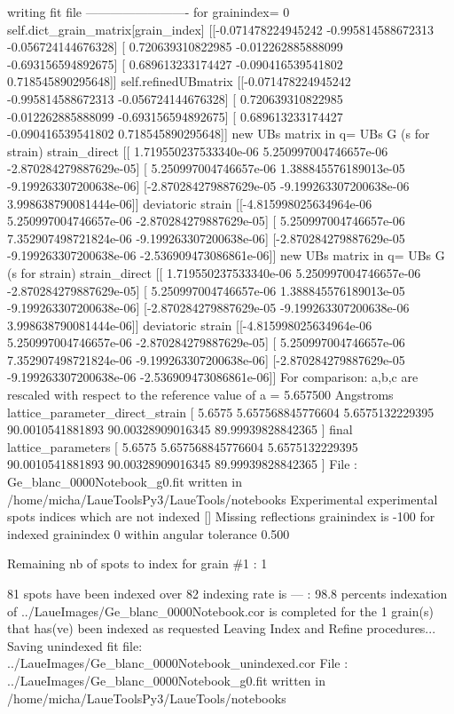 \documentclass[letterpaper,10pt,english]{sphinxmanual}
\begin{document}
\begin{sphinxalltt}
writing fit file -------------------------
for grainindex= 0
self.dict\_grain\_matrix{[}grain\_index{]} {[}{[}-0.071478224945242 -0.995814588672313 -0.056724144676328{]}
 {[} 0.720639310822985 -0.012262885888099 -0.693156594892675{]}
 {[} 0.689613233174427 -0.090416539541802  0.718545890295648{]}{]}
self.refinedUBmatrix {[}{[}-0.071478224945242 -0.995814588672313 -0.056724144676328{]}
 {[} 0.720639310822985 -0.012262885888099 -0.693156594892675{]}
 {[} 0.689613233174427 -0.090416539541802  0.718545890295648{]}{]}
new UBs matrix in q= UBs G (s for strain)
strain\_direct {[}{[} 1.719550237533340e-06  5.250997004746657e-06 -2.870284279887629e-05{]}
 {[} 5.250997004746657e-06  1.388845576189013e-05 -9.199263307200638e-06{]}
 {[}-2.870284279887629e-05 -9.199263307200638e-06  3.998638790081444e-06{]}{]}
deviatoric strain {[}{[}-4.815998025634964e-06  5.250997004746657e-06 -2.870284279887629e-05{]}
 {[} 5.250997004746657e-06  7.352907498721824e-06 -9.199263307200638e-06{]}
 {[}-2.870284279887629e-05 -9.199263307200638e-06 -2.536909473086861e-06{]}{]}
new UBs matrix in q= UBs G (s for strain)
strain\_direct {[}{[} 1.719550237533340e-06  5.250997004746657e-06 -2.870284279887629e-05{]}
 {[} 5.250997004746657e-06  1.388845576189013e-05 -9.199263307200638e-06{]}
 {[}-2.870284279887629e-05 -9.199263307200638e-06  3.998638790081444e-06{]}{]}
deviatoric strain {[}{[}-4.815998025634964e-06  5.250997004746657e-06 -2.870284279887629e-05{]}
 {[} 5.250997004746657e-06  7.352907498721824e-06 -9.199263307200638e-06{]}
 {[}-2.870284279887629e-05 -9.199263307200638e-06 -2.536909473086861e-06{]}{]}
For comparison: a,b,c are rescaled with respect to the reference value of a = 5.657500 Angstroms
lattice\_parameter\_direct\_strain {[} 5.6575             5.657568845776604  5.6575132229395
 90.0010541881893   90.00328909016345  89.99939828842365 {]}
final lattice\_parameters {[} 5.6575             5.657568845776604  5.6575132229395
 90.0010541881893   90.00328909016345  89.99939828842365 {]}
File : Ge\_blanc\_0000Notebook\_g0.fit written in /home/micha/LaueToolsPy3/LaueTools/notebooks
Experimental experimental spots indices which are not indexed {[}{]}
Missing reflections grainindex is -100 for indexed grainindex 0
within angular tolerance 0.500

 Remaining nb of spots to index for grain \#1 : 1

81 spots have been indexed over 82
indexing rate is --- : 98.8 percents
indexation of ../LaueImages/Ge\_blanc\_0000Notebook.cor is completed
for the 1 grain(s) that has(ve) been indexed as requested
Leaving Index and Refine procedures...
Saving unindexed  fit file: ../LaueImages/Ge\_blanc\_0000Notebook\_unindexed.cor
File : ../LaueImages/Ge\_blanc\_0000Notebook\_g0.fit written in /home/micha/LaueToolsPy3/LaueTools/notebooks
\end{sphinxalltt}
\end{document}

